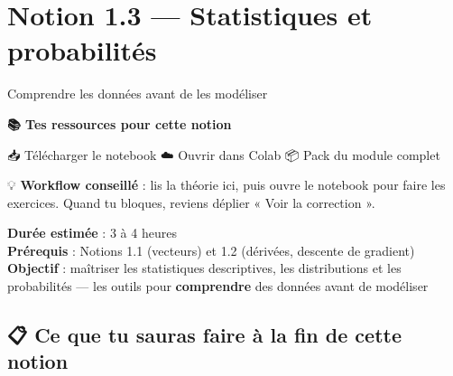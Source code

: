 \documentclass[
  french,
  11pt,
  a4paper,
]{scrbook}
\begin{document}
\chapter{Notion 1.3 --- Statistiques et
probabilités}\label{notion-1.3-statistiques-et-probabilituxe9s}

Comprendre les données avant de les modéliser

\hfill\break

\begin{tcolorbox}[enhanced jigsaw, arc=.35mm, bottomrule=.15mm, breakable, colback=white, colframe=quarto-callout-note-color-frame, left=2mm, leftrule=.75mm, opacityback=0, rightrule=.15mm, toprule=.15mm]

\vspace{-3mm}\textbf{📚 Tes ressources pour cette notion}\vspace{3mm}

📥 Télécharger le notebook ☁️ Ouvrir dans Colab 📦 Pack du module
complet

💡 \textbf{Workflow conseillé} : lis la théorie ici, puis ouvre le
notebook pour faire les exercices. Quand tu bloques, reviens déplier «
Voir la correction ».

\end{tcolorbox}

\begin{tcolorbox}[enhanced jigsaw, arc=.35mm, bottomrule=.15mm, breakable, colback=white, colframe=quarto-callout-note-color-frame, left=2mm, leftrule=.75mm, opacityback=0, rightrule=.15mm, toprule=.15mm]
\begin{minipage}[t]{5.5mm}
\textcolor{quarto-callout-note-color}{\faInfo}
\end{minipage}%
\begin{minipage}[t]{\textwidth - 5.5mm}

\textbf{Durée estimée} : 3 à 4 heures\\
\textbf{Prérequis} : Notions 1.1 (vecteurs) et 1.2 (dérivées, descente
de gradient)\\
\textbf{Objectif} : maîtriser les statistiques descriptives, les
distributions et les probabilités --- les outils pour
\textbf{comprendre} des données avant de modéliser

\end{minipage}%
\end{tcolorbox}

\section{📋 Ce que tu sauras faire à la fin de cette
notion}\label{ce-que-tu-sauras-faire-uxe0-la-fin-de-cette-notion-2}
\end{document}
